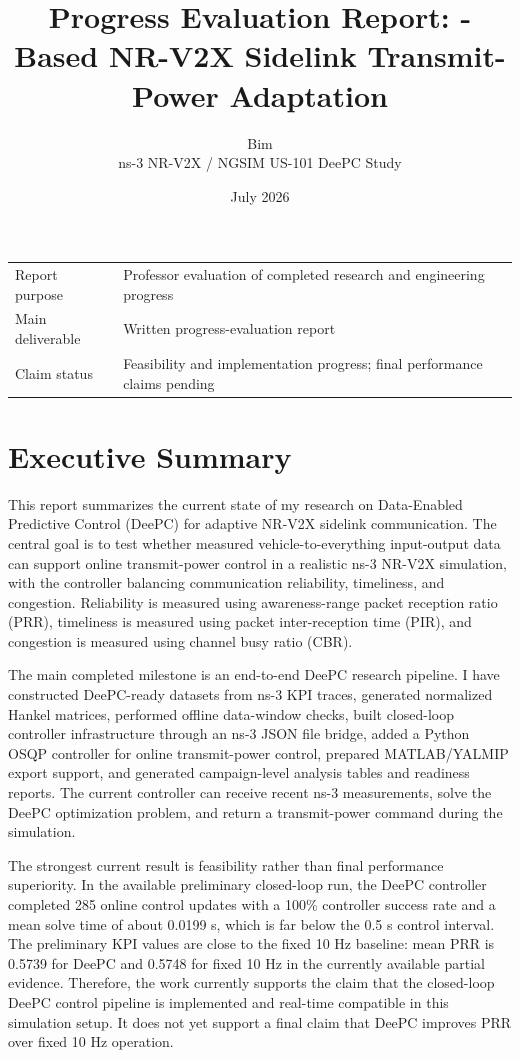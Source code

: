 \documentclass[11pt]{article}
\title{\textbf{Progress Evaluation Report: \deePC-Based NR-V2X Sidelink Transmit-Power Adaptation}}
\author{Bim\\
\small ns-3 NR-V2X / NGSIM US-101 DeePC Study}
\date{July 2026}
\newcommand{\deePC}{DeePC}
\begin{document}
\maketitle

\begin{center}
\begin{tabular}{ll}
\toprule
Report purpose & Professor evaluation of completed research and engineering progress \\
Main deliverable & Written progress-evaluation report \\
Claim status & Feasibility and implementation progress; final performance claims pending \\
\bottomrule
\end{tabular}
\end{center}

\tableofcontents
\newpage

\section{Executive Summary}

This report summarizes the current state of my research on Data-Enabled
Predictive Control (\deePC) for adaptive NR-V2X sidelink communication. The
central goal is to test whether measured vehicle-to-everything input-output
data can support online transmit-power control in a realistic ns-3 NR-V2X
simulation, with the controller balancing communication reliability,
timeliness, and congestion. Reliability is measured using awareness-range
packet reception ratio (PRR), timeliness is measured using packet
inter-reception time (PIR), and congestion is measured using channel busy ratio
(CBR).

The main completed milestone is an end-to-end \deePC{} research pipeline. I
have constructed \deePC-ready datasets from ns-3 KPI traces, generated
normalized Hankel matrices, performed offline data-window checks, built
closed-loop controller infrastructure through an ns-3 JSON file bridge, added a
Python OSQP controller for online transmit-power control, prepared
MATLAB/YALMIP export support, and generated campaign-level analysis tables and
readiness reports. The current controller can receive recent ns-3 measurements,
solve the \deePC{} optimization problem, and return a transmit-power command
during the simulation.

The strongest current result is feasibility rather than final performance
superiority. In the available preliminary closed-loop run, the \deePC{}
controller completed 285 online control updates with a 100\% controller
success rate and a mean solve time of about 0.0199 s, which is far below the
0.5 s control interval. The preliminary KPI values are close to the fixed
10 Hz baseline: mean PRR is 0.5739 for \deePC{} and 0.5748 for fixed 10 Hz in
the currently available partial evidence. Therefore, the work currently
supports the claim that the closed-loop \deePC{} control pipeline is
implemented and real-time compatible in this simulation setup. It does not yet
support a final claim that \deePC{} improves PRR over fixed 10 Hz operation.
\end{document}
